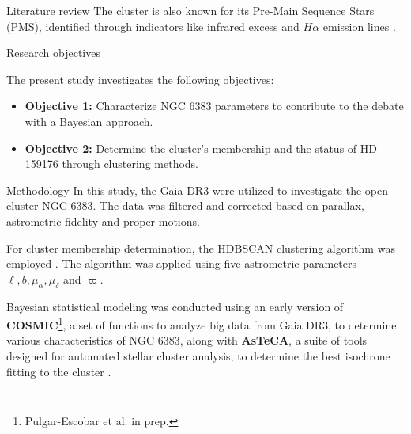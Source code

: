 \documentclass[final]{beamer}
\newlength{\colwidth}
\begin{document}
\begin{frame}[t]
\begin{columns}[t]
\begin{column}{\colwidth}
\begin{block}{Literature review}
The cluster is also known for its Pre-Main Sequence Stars (PMS), identified through indicators like infrared excess and \(H\alpha\) emission lines \citep{1985A&A...151..391T, 2000A&A...362..580V}.

  \end{block}

  \begin{alertblock}{Research objectives}

    The present study investigates the following objectives:

    \begin{itemize}
      \item \textbf{Objective 1:} Characterize NGC 6383 parameters to contribute to the debate with a Bayesian approach.
      
      \item \textbf{Objective 2:} 
      Determine the cluster's membership and the status of HD 159176 through clustering methods.
    \end{itemize}

  \end{alertblock}

 \begin{block}{Methodology}
In this study, the Gaia DR3 were utilized to investigate the open cluster NGC 6383. The data was filtered and corrected based on parallax, astrometric fidelity and proper motions.

For cluster membership determination, the HDBSCAN clustering algorithm was employed \citep{McInnes2017}. The algorithm was applied using five astrometric parameters $\ell,b,\mu_{\alpha},\mu_{\delta}$ and $\varpi$.

Bayesian statistical modeling was conducted using an early version of \textbf{COSMIC}\footnote{Pulgar-Escobar et al. in prep.}, a set of functions to analyze big data from Gaia DR3, to determine various characteristics of NGC 6383, along with \textbf{AsTeCA}, a suite of tools designed for automated stellar cluster analysis, to determine the best isochrone fitting to the cluster \citep{2015A&A...576A...6P}.

 \end{block}


\end{column}
\end{columns}
\end{frame}
\end{document}
